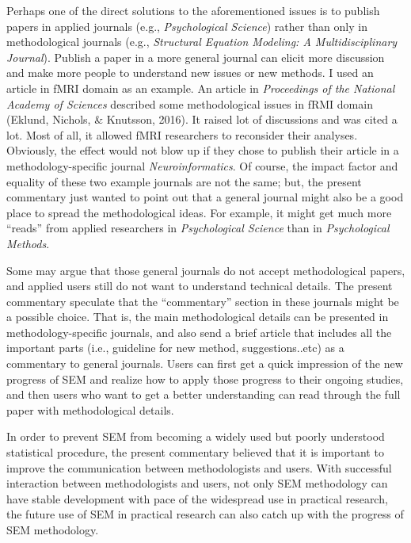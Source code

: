 \documentclass[jou]{apa6}
\theoremstyle{definition}
\theoremstyle{definition}
\theoremstyle{definition}
\theoremstyle{remark}
\begin{document}
Perhaps one of the direct solutions to the aforementioned issues is to
publish papers in applied journals (e.g., \emph{ Psychological Science})
rather than only in methodological journals (e.g., \emph{Structural
Equation Modeling: A Multidisciplinary Journal}). Publish a paper in a
more general journal can elicit more discussion and make more people to
understand new issues or new methods. I used an article in fMRI domain
as an example. An article in \emph{Proceedings of the National Academy
of Sciences} described some methodological issues in fRMI domain
(Eklund, Nichols, \& Knutsson, 2016). It raised lot of discussions and
was cited a lot. Most of all, it allowed fMRI researchers to reconsider
their analyses. Obviously, the effect would not blow up if they chose to
publish their article in a methodology-specific journal
\emph{Neuroinformatics}. Of course, the impact factor and equality of
these two example journals are not the same; but, the present commentary
just wanted to point out that a general journal might also be a good
place to spread the methodological ideas. For example, it might get much
more \enquote{reads} from applied researchers in \emph{Psychological
Science} than in \emph{Psychological Methods}.

Some may argue that those general journals do not accept methodological
papers, and applied users still do not want to understand technical
details. The present commentary speculate that the \enquote{commentary}
section in these journals might be a possible choice. That is, the main
methodological details can be presented in methodology-specific
journals, and also send a brief article that includes all the important
parts (i.e., guideline for new method, suggestions..etc) as a commentary
to general journals. Users can first get a quick impression of the new
progress of SEM and realize how to apply those progress to their ongoing
studies, and then users who want to get a better understanding can read
through the full paper with methodological details.

In order to prevent SEM from becoming a widely used but poorly
understood statistical procedure, the present commentary believed that
it is important to improve the communication between methodologists and
users. With successful interaction between methodologists and users, not
only SEM methodology can have stable development with pace of the
widespread use in practical research, the future use of SEM in practical
research can also catch up with the progress of SEM methodology.
\end{document}
